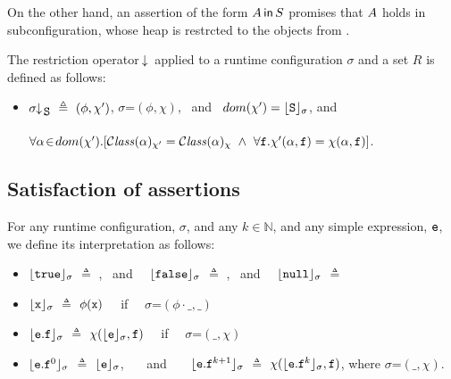  On the other hand, an assertion of the form $A\,{\bf{\sf {in}}}\, S$ promises that $A$ holds in subconfiguration, whose heap is restrcted to the objects from .  

 \begin{definition}  The restriction operator\  $\!\!\downarrow\!_{} $ applied to a runtime configuration $\sigma$ and a set $R$ is defined as follows:   
 \label{def:config:restrct}
 $~ $ 
 
\begin{itemize}
\item
$\restrct {\sigma}{\prg{S}} \ \triangleq \ (\phi, \chi')$, \IFF  $\sigma$=$(\phi,\chi)$, \ and  \  $dom(\chi')={\lfloor{ {{\mbox{\tt{S}}}}}\rfloor_{\sigma}}$, and  \\
$\ \strut \ \ \hspace{1.2in} $  
 $\forall \alpha\!\in\!dom(\chi').[ {\mathcal C}{\mathit{lass}}(\alpha)_{\chi'} =  {\mathcal C}{\mathit{lass}}(\alpha)_{\chi}\ \wedge \ \forall {\mbox{\tt{f}}}.  \chi'(\alpha,{\mbox{\tt{f}}})=\chi(\alpha,{\mbox{\tt{f}}})]$.
\end{itemize}
\end{definition} 

\subsection{Satisfaction of assertions}



\begin{definition}

For any runtime configuration, $\sigma$, and any $k\in \mathbb{N}$, and any simple expression, ${\mbox{\tt{e}}}$, we define its interpretation as follows:

\begin{itemize}
     \item 
  ${\lfloor{ {{\mbox{\tt{true}}}}}\rfloor_{\sigma}}$ $ \triangleq$   , \ and \ \    ${\lfloor{ {{\mbox{\tt{false}}}}}\rfloor_{\sigma}}$ $ \triangleq$ , \ and \ \ 
   $\interp {}{\sigma}$ $ \triangleq$  \prg{null}
  \item
  ${\lfloor{ {{\mbox{\tt{x}}}}}\rfloor_{\sigma}}$ $ \triangleq$ $\phi({\mbox{\tt{x}}})$  \ \ if \ \ $\sigma$=$(\phi\cdot\_,\_)$
  \item
  ${\lfloor{ {\ensuremath{{\mbox{\tt{e}}}}.{\mbox{\tt{f}}}}}\rfloor_{\sigma}}$ $ \triangleq$ $\chi({{\lfloor{ {\ensuremath{{\mbox{\tt{e}}}}}}\rfloor_{\sigma}}}, {\mbox{\tt{f}}})$  \ \ if \ \ $\sigma$=$(\_,\chi)$
   \item
     ${\lfloor{ {\ensuremath{{\mbox{\tt{e}}}}.{\mbox{\tt{f}}}^0}}\rfloor_{\sigma}}$ $ \triangleq$  ${\lfloor{ {\ensuremath{{\mbox{\tt{e}}}}}}\rfloor_{\sigma}}$, \ \ \ and \ \ \ ${\lfloor{ {\ensuremath{{\mbox{\tt{e}}}}.{\mbox{\tt{f}}}^{k+1}}}\rfloor_{\sigma}}$ $ \triangleq$  $\chi({{\lfloor{ {\ensuremath{{\mbox{\tt{e}}}}.{\mbox{\tt{f}}}^k}}\rfloor_{\sigma}}}, {\mbox{\tt{f}}})$, where $\sigma$=$(\_,\chi)$.
   \end{itemize}
\end{definition}

